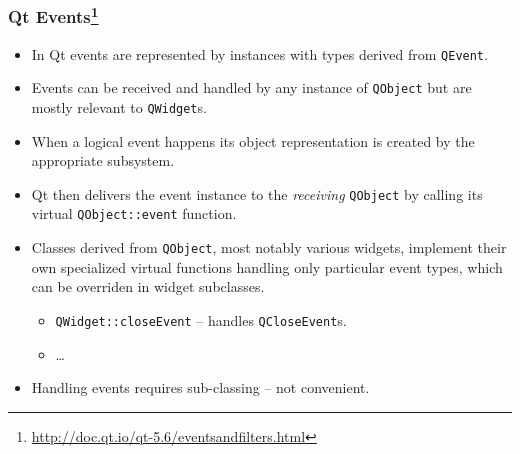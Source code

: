 \begin{frame}
  \frametitle{Qt Events\footnote
    {\url{http://doc.qt.io/qt-5.6/eventsandfilters.html}}}
  \small
  \begin{itemize}
    \item In Qt events are represented by instances with types derived from
     \texttt{QEvent}.
    \item Events can be received and handled by any instance of \texttt{QObject}
      but are mostly relevant to \texttt{QWidget}s.
    \item When a logical event happens its object representation is created by the
      appropriate subsystem.
    \item Qt then delivers the event instance to the {\em receiving}
      \texttt{QObject} by calling its virtual \texttt{QObject::event} function.
    \item Classes derived from \texttt{QObject}, most notably various widgets,
      implement their own specialized virtual functions handling only particular
      event types, which can be overriden in widget subclasses.
      \begin{itemize}
        \item \texttt{QWidget::closeEvent} -- handles \texttt{QCloseEvent}s.
        \item \ldots
      \end{itemize}
    \item Handling events requires sub-classing -- not convenient.
  \end{itemize}
\end{frame}

